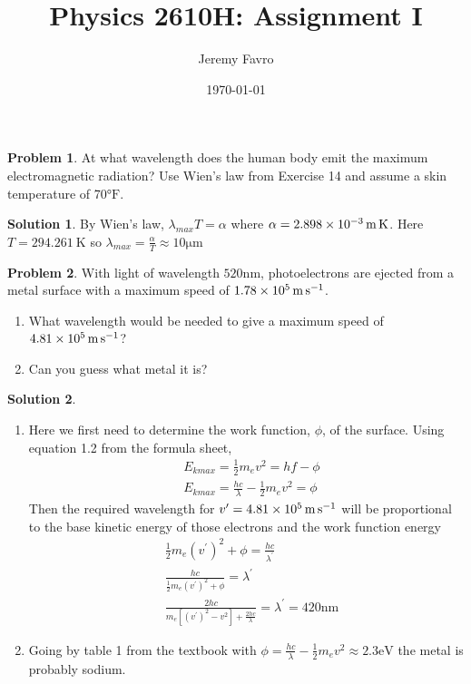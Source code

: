 \documentclass[10pt]{article}
\title{Physics 2610H: Assignment I}
\author{Jeremy Favro}
\date{\today}
\theoremstyle{definition}
\newtheorem{problem}{Problem}
\newtheorem{soln}{Solution}
\begin{document}
\maketitle

\begin{problem}
At what wavelength does the human body emit the maximum electromagnetic radiation? Use Wien's law from Exercise 14 and assume a skin
temperature of 70$\unit{\degree}\mathrm{F}$.
\end{problem}
\begin{soln}
  By Wien's law, $\lambda_{max}T=\alpha$ where $\alpha=\qty{2.898d-3}{\meter\kelvin}$. Here $T=\qty{294.261}{\kelvin}$ so $\lambda_{max}=\frac{\alpha}{T}\approx10\unit{\micro\meter}$
\end{soln}

\begin{problem}
With light of wavelength $520\unit{\nano\meter}$, photoelectrons are ejected from a metal surface with a maximum speed of $\qty{1.78d5}{\meter\per\second}$.
\begin{enumerate}[label=(\alph*)]
  \item What wavelength would be needed to give a maximum speed of $\qty{4.81d5}{\meter\per\second}$?
  \item Can you guess what metal it is?
\end{enumerate}
\end{problem}
\begin{soln}
  ~\begin{enumerate}[label=(\alph*)]
    \item Here we first need to determine the work function, $\phi$, of the surface. Using equation 1.2 from the formula sheet,
    \begin{align*}
      & E_{kmax}=\frac{1}{2}m_ev^2=hf-\phi\\
      & E_{kmax}=\frac{hc}{\lambda}-\frac{1}{2}m_ev^2=\phi
    \end{align*}
    Then the required wavelength for $v^\prime=\qty{4.81d5}{\meter\per\second}$ will be proportional to the base kinetic energy of those electrons and the work function energy
    \begin{align*}
      & \frac{1}{2}m_e\left(v^\prime\right)^2+\phi=\frac{hc}{\lambda^\prime} \\
      & \frac{hc}{\frac{1}{2}m_e\left(v^\prime\right)^2+\phi}=\lambda^\prime \\
      & \frac{2hc}{m_e\left[\left(v^\prime\right)^2-v^2\right]+\frac{2hc}{\lambda}}=\lambda^\prime=420\unit{\nano\meter}
    \end{align*}
    \item Going by table 1 from the textbook with $\phi=\frac{hc}{\lambda}-\frac{1}{2}m_ev^2\approx2.3\unit{\electronvolt}$ the metal is probably sodium.
  \end{enumerate}
\end{soln}
\end{document}

